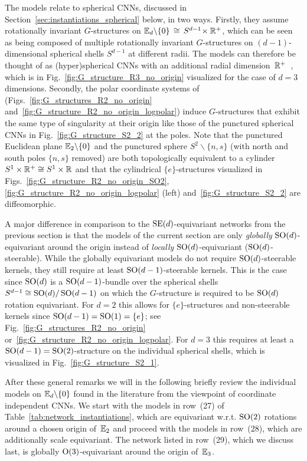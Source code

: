 The models relate to spherical CNNs, discussed in Section~\ref{sec:instantiations_spherical} below, in two ways.
Firstly, they assume rotationally invariant $G$-structures on $\mathbb{E}_d \backslash \{0\} \,\cong\, S^{d-1} \!\times \mathbb{R}^+$, which can be seen as being composed of multiple rotationally invariant $G$-structures on ${(d -\! 1)}$-dimensional spherical shells $S^{d-1}$ at different radii.
The models can therefore be thought of as (hyper)spherical CNNs with an additional radial dimension~$\mathbb{R}^+$~\cite{ramasinghe2019representation}, which is in Fig.~\ref{fig:G_structure_R3_no_origin} visualized for the case of $d=3$ dimensions.
Secondly, the polar coordinate systems of \cite{esteves2017polar,finzi2020generalizing,chidester2019rotation} (Figs.~\ref{fig:G_structures_R2_no_origin} and~\ref{fig:G_structure_R2_no_origin_logpolar}) induce $G$-structures that exhibit the same type of singularity at their origin like those of the punctured spherical CNNs in Fig.~\ref{fig:G_structure_S2_2} at the poles.
Note that the punctured Euclidean plane $\mathbb{E}_2 \backslash \{0\}$ and the punctured sphere $S^2 \backslash \{n,s\}$ (with north and south poles $\{n,s\}$ removed) are both topologically equivalent to a cylinder $S^1 \times \mathbb{R}^+ \cong S^1 \times \mathbb{R}$ and that the cylindrical $\{e\}$-structures visualized in Figs.~\ref{fig:G_structure_R2_no_origin_SO2}, \ref{fig:G_structure_R2_no_origin_logpolar} (left) and~\ref{fig:G_structure_S2_2} are diffeomorphic.


A major difference in comparison to the $\operatorname{SE}(d)$-equivariant networks from the previous section is that the models of the current section are only \emph{globally} $\operatorname{SO}(d)$-equivariant around the origin instead of \emph{locally} $\operatorname{SO}(d)$-equivariant ($\operatorname{SO}(d)$-steerable).
While the globally equivariant models do not require $\operatorname{SO}(d)$-steerable kernels, they still require at least $\operatorname{SO}(d-1)$-steerable kernels.
This is the case since $\operatorname{SO}(d)$ is a $\operatorname{SO}(d-1)$-bundle over the spherical shells $S^{d-1} \cong \operatorname{SO}(d)/\operatorname{SO}(d-1)$ on which the $G$-structure is required to be $\operatorname{SO}(d)$ rotation equivariant.
For $d=2$ this allows for $\{e\}$-structures and non-steerable kernels since $\operatorname{SO}(d-1) = \operatorname{SO}(1) = \{e\}$; see Fig.~\ref{fig:G_structures_R2_no_origin} or~\ref{fig:G_structure_R2_no_origin_logpolar}.
For $d=3$ this requires at least a $\operatorname{SO}(d-1) = \operatorname{SO}(2)$-structure on the individual spherical shells, which is visualized in Fig.~\ref{fig:G_structure_S2_1}.


After these general remarks we will in the following briefly review the individual models on $\mathbb{E}_d \backslash \{0\}$ found in the literature from the viewpoint of coordinate independent CNNs.
We start with the models in row~(27) of Table~\ref{tab:network_instantiations}, which are equivariant w.r.t. $\operatorname{SO}(2)$ rotations around a chosen origin of~$\mathbb{E}_2$ and proceed with the models in row~(28), which are additionally scale equivariant.
The network listed in row~(29), which we discuss last, is globally $\operatorname{O}(3)$-equivariant around the origin of~$\mathbb{E}_3$.

